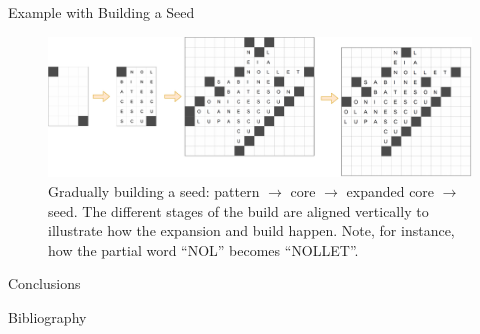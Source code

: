 \documentclass[aspectratio=169,usenames,dvipsnames]{beamer}
\numberwithin{equation}{section}
\numberwithin{theorem}{section}
\numberwithin{lem}{section}
\numberwithin{df}{section}
\begin{document}
\begin{frame}{Example with Building a Seed}

\begin{figure}
\centering
\includegraphics[width=\textwidth]{figs/4part.pdf}
\caption{Gradually building a seed: pattern $\rightarrow$ core $\rightarrow$ expanded core $\rightarrow$ seed. The different stages of the build are aligned vertically to illustrate how the expansion and build happen. Note, for instance, how the partial word ``NOL'' becomes ``NOLLET''. }
\label{fig:pattern}
\end{figure}

\end{frame}






\begin{frame}{Conclusions}


\end{frame}




\begin{frame}[allowframebreaks]{Bibliography}
\renewcommand*{\bibfont}{\footnotesize}
\printbibliography
\end{frame}

\end{document}
